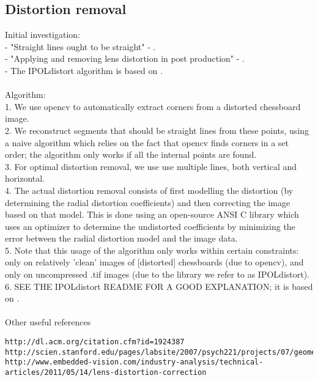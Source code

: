 \subsection{Distortion removal}
Initial investigation:\\
- "Straight lines ought to be straight" - \cite{straightlines} .\\
- "Applying and removing lens distortion in post production" - \cite{postproduction} .\\
- The IPOLdistort algorithm is based on \cite{algebraic-distortion} .\\\\
Algorithm:\\
1. We use opencv to automatically extract corners from a distorted chessboard image.\\
2. We reconstruct segments that should be straight lines from these points, using a naive algorithm which relies on the fact that opencv finds corners in a set order; the algorithm only works if all the internal points are found.\\
3. For optimal distortion removal, we use use multiple lines, both vertical and horizontal.\\
4. The actual distortion removal consists of first modelling the distortion (by determining the radial distortion coefficients) and then correcting the image based on that model. This is done using an open-source ANSI C library which uses an optimizer to determine the undistorted coefficients by minimizing the error between the radial distortion model and the image data.\\
5. Note that this usage of the algorithm only works within certain constraints: only on relatively 'clean' images of [distorted] chessboards (due to opencv), and only on uncompressed .tif images (due to the library we refer to as IPOLdistort).\\
6. SEE THE IPOLdistort README FOR A GOOD EXPLANATION; it is based on \cite{algebraic-distortion}.\\\\
Other useful references\\
\begin{verbatim}
http://dl.acm.org/citation.cfm?id=1924387
http://scien.stanford.edu/pages/labsite/2007/psych221/projects/07/geometric_distortion/project.htm
http://www.embedded-vision.com/industry-analysis/technical-articles/2011/05/14/lens-distortion-correction
\end{verbatim}
